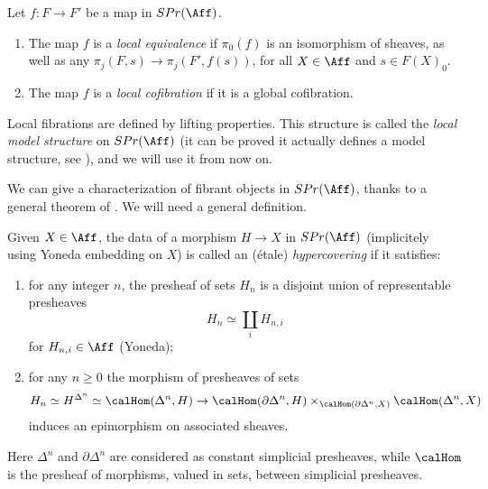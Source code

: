         \begin{defn}
            \label{defn:local_structure_classic}
            Let $f\colon F \to F'$ be a map in $SPr(\Aff)$.
            \begin{enumerate}
                \item The map $f$ is a \emph{local equivalence} if $\pi_0(f)$ is an isomorphism of sheaves, as well as any $\pi_j(F, s) \to \pi_j(F', f(s))$, for all $X \in \Aff$ and $s \in F(X)_0$.
                \item The map $f$ is a \emph{local cofibration} if it is a global cofibration.
            \end{enumerate}
            Local fibrations are defined by lifting properties. This structure is called the \emph{local model structure} on $SPr(\Aff)$ (it can be proved it actually defines a model structure, see \cite{Blander:model}), and we will use it from now on.
        \end{defn}
        We can give a characterization of fibrant objects in $SPr(\Aff)$, thanks to a general theorem of \cite{DHI:hypercover}. We will need a general definition.%
        \begin{defn}[Hypercovering]
            \label{defn:hypercovering_classic}
            Given $X \in \Aff$, the data of a morphism $H \to X$ in $SPr(\Aff)$ (implicitely using Yoneda embedding on $X$) is called an (étale) \emph{hypercovering} if it satisfies:
            \begin{enumerate}
                \item for any integer $n$, the presheaf of sets $H_n$ is a disjoint union of representable presheaves \[H_n \simeq \coprod_i H_{n,i} \] for $H_{n,i} \in \Aff$ (Yoneda);
                \item for any $n \geq 0$ the morphism of presheaves of sets \[H_n \simeq H^{\Delta^n} \simeq \calHom(\Delta^n, H) \to \calHom(\partial\Delta^n, H) \times_{\calHom(\partial\Delta^n, X)} \calHom(\Delta^n, X) \] induces an epimorphism on associated sheaves.
            \end{enumerate}
            Here $\Delta^n$ and $\partial\Delta^n$ are considered as constant simplicial presheaves, while $\calHom$ is the presheaf of morphisms, valued in sets, between simplicial presheaves.
        \end{defn}

